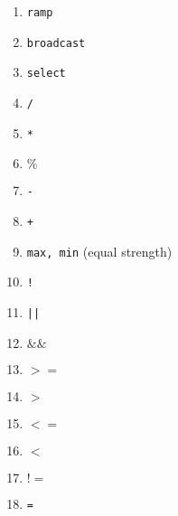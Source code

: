 \documentclass[sigplan,review,anonymous]{acmart}\settopmatter{printfolios=true,printccs=false,printacmref=false}
\begin{document}
\begin{enumerate}
  \item \texttt{ramp}
  \item \texttt{broadcast}
  \item \texttt{select}
  \item \texttt{/}
  \item \texttt{*}
  \item \texttt{$\%$}
  \item \texttt{-}
  \item \texttt{+}
  \item \texttt{max, min} (equal strength)
  \item \texttt{!}
  \item \texttt{||}
  \item \texttt{$\&\&$}
  \item \texttt{$>=$}
  \item \texttt{$>$}
  \item \texttt{$<=$}
  \item \texttt{$<$}
  \item \texttt{$!=$}
  \item \texttt{=}
\end{enumerate}
\end{document}
